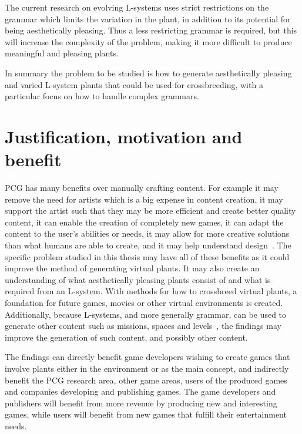 The current research on evolving \glspl{L-system} uses strict restrictions on the grammar which limits the variation in the plant, in addition to its potential for being aesthetically pleasing. %
Thus a less restricting grammar is required, but this will increase the complexity of the problem, making it more difficult to produce meaningful and pleasing plants.

In summary the problem to be studied is how to generate aesthetically pleasing and varied \gls{L-system} plants that could be used for crossbreeding, with a particular focus on how to handle complex grammars.

\section{Justification, motivation and benefit}
\gls{PCG} has many benefits over manually crafting content.
For example it may remove the need for artists which is a big expense in content creation, it may support the artist such that they may be more efficient and create better quality content, it can enable the creation of completely new games, it can adapt the content to the user's abilities or needs, it may allow for more creative solutions than what humans are able to create, and it may help understand design~\cite{PCG_1}.
The specific problem studied in this thesis may have all of these benefits as it could improve the method of generating virtual plants.
It may also create an understanding of what aesthetically pleasing plants consist of and what is required from an \gls{L-system}.
With methods for how to crossbreed virtual plants, a foundation for future games, movies or other virtual environments is created.
Additionally, because \glspl{L-system}, and more generally grammar, can be used to generate other content such as missions, spaces and levels~\cite{PCG_5}, the findings may improve the generation of such content, and possibly other content.

The findings can directly benefit game developers wishing to create games that involve plants either in the environment or as the main concept, and indirectly benefit the \gls{PCG} research area, other game areas, users of the produced games and companies developing and publishing games.
The game developers and publishers will benefit from more revenue by producing new and interesting games, while users will benefit from new games that fulfill their entertainment needs.

